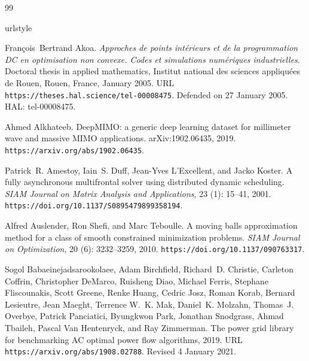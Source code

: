 \documentclass[pdflatex,sn-mathphys-num]{sn-jnl}
\theoremstyle{thmstyleone}
\theoremstyle{thmstylethree}
\newcounter{algorithm}
\begin{document}
\FloatBarrier
\begingroup\small\setlength{\bibsep}{2pt}\begin{thebibliography}{99}

\providecommand{\natexlab}[1]{#1}
\providecommand{\url}[1]{\texttt{#1}}
\expandafter\ifx\csname urlstyle\endcsname\relax
  \providecommand{\doi}[1]{doi: #1}\else
  \providecommand{\doi}{doi: \begingroup \urlstyle{rm}\Url}\fi


Fran\c{c}ois~Bertrand Akoa.
\newblock \emph{Approches de points int{\'e}rieurs et de la programmation {DC}
  en optimisation non convexe. Codes et simulations num{\'e}riques
  industrielles}.
\newblock Doctoral thesis in applied mathematics, Institut national des
  sciences appliqu{\'e}es de Rouen, Rouen, France, January 2005.
\newblock URL \url{https://theses.hal.science/tel-00008475}.
\newblock Defended on 27 January 2005. HAL: tel-00008475.

Ahmed Alkhateeb.
\newblock DeepMIMO: a generic deep learning dataset for millimeter wave and massive MIMO applications.
\newblock arXiv:1902.06435, 2019.
\newblock \url{https://arxiv.org/abs/1902.06435}.

Patrick~R. Amestoy, Iain~S. Duff, Jean-Yves {L'Excellent}, and Jacko Koster.
\newblock A fully asynchronous multifrontal solver using distributed dynamic
  scheduling.
\newblock \emph{SIAM Journal on Matrix Analysis and Applications}, 23
  (1): 15--41, 2001.
\newblock \url{https://doi.org/10.1137/S0895479899358194}.

Alfred Auslender, Ron Shefi, and Marc Teboulle.
\newblock A moving balls approximation method for a class of smooth constrained
  minimization problems.
\newblock \emph{SIAM Journal on Optimization}, 20 (6):
  3232--3259, 2010.
\newblock \url{https://doi.org/10.1137/090763317}.

Sogol Babaeinejadsarookolaee, Adam Birchfield, Richard~D. Christie, Carleton
  Coffrin, Christopher DeMarco, Ruisheng Diao, Michael Ferris, Stephane
  Fliscounakis, Scott Greene, Renke Huang, Cedric Josz, Roman Korab, Bernard
  Lesieutre, Jean Maeght, Terrence W.~K. Mak, Daniel~K. Molzahn, Thomas~J.
  Overbye, Patrick Panciatici, Byungkwon Park, Jonathan Snodgrass, Ahmad
  Tbaileh, Pascal {Van Hentenryck}, and Ray Zimmerman.
\newblock The power grid library for benchmarking {AC} optimal power flow
  algorithms, 2019.
\newblock URL \url{https://arxiv.org/abs/1908.02788}.
\newblock Revised 4 January 2021.


\end{thebibliography}
\end{document}
